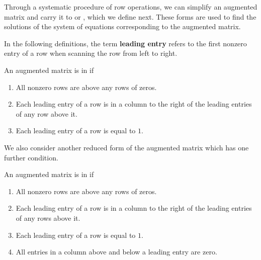Through a systematic
procedure of row operations, we can simplify an augmented matrix and carry it to \textbf{\ef} or \textbf{\rref}, which we define next. These 
forms are used to find the solutions of the system of equations corresponding to the augmented matrix.

In the following definitions, the term
\textbf{leading entry}
refers to
 the first nonzero entry of a row when scanning the row
from left to right.

\begin{definition}{\EF}\label{def:echelonform}
An augmented matrix is
\index{\ef} in \textbf{\ef} if

\begin{enumerate}
\item All nonzero rows are above any rows of zeros.

\item Each leading entry of a row is in a column to the right of the leading entries of any row above it. 


\item Each leading entry of a row is equal to $1$.

\end{enumerate}
\end{definition}

We also consider another reduced form of the augmented matrix which has one further condition. 


\begin{definition}{\RREF}\label{def:rref}
An augmented 
\index{\rref} matrix is in \textbf{\rref } if

\begin{enumerate}
\item All nonzero rows are above any rows of zeros.

\item Each leading entry of a row is in a column to the right of the leading
entries of any rows above it.

\item Each leading entry of a row is equal to $1$.

\item All entries in a column above and below a leading entry are zero.

\end{enumerate}
\end{definition}

